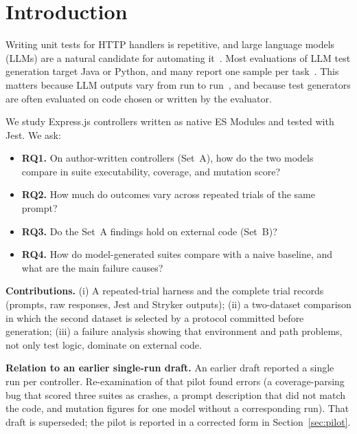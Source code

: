 \documentclass[sigconf]{acmart}
\begin{document}
\maketitle

\section{Introduction}
Writing unit tests for HTTP handlers is repetitive, and large language models (LLMs) are a natural candidate for automating it~\cite{wang2024survey}. Most evaluations of LLM test generation target Java or Python, and many report one sample per task~\cite{yuan2023chatgpt,siddiq2024junit,yang2024evaluation}. This matters because LLM outputs vary from run to run~\cite{ouyang2023nondeterminism}, and because test generators are often evaluated on code chosen or written by the evaluator.

We study Express.js controllers written as native ES Modules and tested with Jest. We ask:
\begin{itemize}
\item \textbf{RQ1.} On author-written controllers (Set~A), how do the two models compare in suite executability, coverage, and mutation score?
\item \textbf{RQ2.} How much do outcomes vary across repeated trials of the same prompt?
\item \textbf{RQ3.} Do the Set~A findings hold on external code (Set~B)?
\item \textbf{RQ4.} How do model-generated suites compare with a naive baseline, and what are the main failure causes?
\end{itemize}

\textbf{Contributions.} (i) A repeated-trial harness and the complete trial records (prompts, raw responses, Jest and Stryker outputs); (ii) a two-dataset comparison in which the second dataset is selected by a protocol committed before generation; (iii) a failure analysis showing that environment and path problems, not only test logic, dominate on external code.

\textbf{Relation to an earlier single-run draft.} An earlier draft reported a single run per controller. Re-examination of that pilot found errors (a coverage-parsing bug that scored three suites as crashes, a prompt description that did not match the code, and mutation figures for one model without a corresponding run). That draft is superseded; the pilot is reported in a corrected form in Section~\ref{sec:pilot}.
\end{document}
